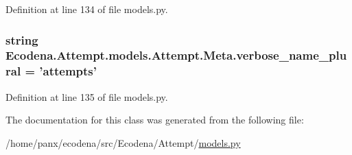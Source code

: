 Definition at line 134 of file models.py.

\hypertarget{class_ecodena_1_1_attempt_1_1models_1_1_attempt_1_1_meta_a6c17e0ddf87e78bbb89ec50ff652dd5c}{
\subsubsection[{verbose\_\-name\_\-plural}]{\setlength{\rightskip}{0pt plus 5cm}string {\bf Ecodena.Attempt.models.Attempt.Meta.verbose\_\-name\_\-plural} = 'attempts'}}
\label{d9/d75/class_ecodena_1_1_attempt_1_1models_1_1_attempt_1_1_meta_a6c17e0ddf87e78bbb89ec50ff652dd5c}


Definition at line 135 of file models.py.



The documentation for this class was generated from the following file:\begin{DoxyCompactItemize}
\item 
/home/panx/ecodena/src/Ecodena/Attempt/\hyperlink{_attempt_2models_8py}{models.py}\end{DoxyCompactItemize}
